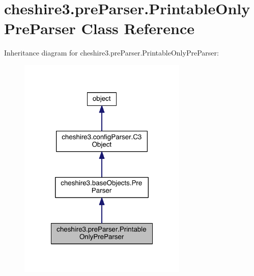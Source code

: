 \hypertarget{classcheshire3_1_1pre_parser_1_1_printable_only_pre_parser}{\section{cheshire3.\-pre\-Parser.\-Printable\-Only\-Pre\-Parser Class Reference}
\label{classcheshire3_1_1pre_parser_1_1_printable_only_pre_parser}
}


Inheritance diagram for cheshire3.\-pre\-Parser.\-Printable\-Only\-Pre\-Parser\-:
\nopagebreak
\begin{figure}[H]
\begin{center}
\leavevmode
\includegraphics[width=228pt]{classcheshire3_1_1pre_parser_1_1_printable_only_pre_parser__inherit__graph}
\end{center}
\end{figure}


